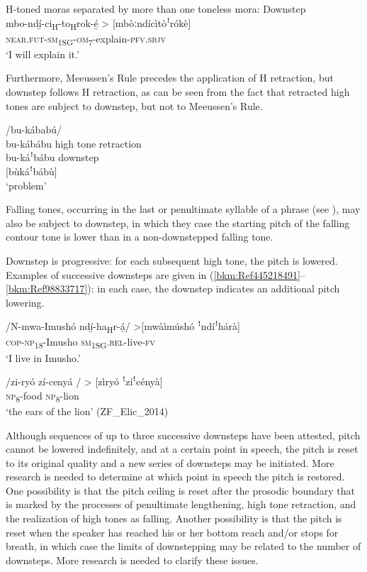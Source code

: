 \ea
\label{bkm:Ref99552164}
  H-toned moras separated by more than one toneless mora: Downstep\\

\gll mbo-ndí̲-ci\textsubscript{H}-to\textsubscript{H}rok-é̲ > [mbòːndícìtòꜝrókè]\\
\textsc{near}.\textsc{fut}-\textsc{sm}\textsubscript{1SG}-\textsc{om}\textsubscript{7}-explain-\textsc{pfv}.\textsc{sbjv}\\
\glt ‘I will explain it.’
\z

Furthermore, Meeussen’s Rule precedes the application of H retraction, but downstep follows H retraction, as can be seen from the fact that retracted high tones are subject to downstep, but not to Meeussen’s Rule.

\ea
 /bu-kábabú/\\
bu-kábábu  high tone retraction\\
bu-káꜝbábu  downstep\\
{}[bùkáꜝbábù]\\
\glt ‘problem’
\z

Falling tones, occurring in the last or penultimate syllable of a phrase (see ), may also be subject to downstep, in which they case the starting pitch of the falling contour tone is lower than in a non-downstepped falling tone.

Downstep is progressive: for each subsequent high tone, the pitch is lowered. Examples of succes\-sive downsteps are given in (\ref{bkm:Ref445218491}--\ref{bkm:Ref98833717}): in each case, the downstep indicates an additional pitch lowering.

\ea
\label{bkm:Ref445218491}
\gll /N-mwa-Imushó  ndí̲-ha\textsubscript{H}r-á̲/ >[mwàìmúshó ꜝndíꜝhárà]\\
\textsc{cop}-\textsc{np}\textsubscript{18}-Imusho  \textsc{sm}\textsubscript{1SG}.\textsc{rel}-live-\textsc{fv}\\
\glt ‘I live in Imusho.’
\z

\ea
\label{bkm:Ref98833717}
\gll /zi-ryó  zí-cenyá / > [zìryó ꜝzíꜝcényà]\\
\textsc{np}\textsubscript{8}-food  \textsc{np}\textsubscript{8}-lion\\
\glt ‘the ears of the lion’ (ZF\_Elic\_2014)
\z

Although sequences of up to three successive downsteps have been attested, pitch cannot be low\-ered indefinitely, and at a certain point in speech, the pitch is reset to its original quality and a new series of downsteps may be initiated. More research is needed to determine at which point in speech the pitch is restored. One possibility is that the pitch ceiling is reset after the prosodic bound\-ary that is marked by the processes of penultimate lengthening, high tone retraction, and the realization of high tones as falling. Another possibility is that the pitch is reset when the speaker has reached his or her bottom reach and/or stops for breath, in which case the limits of downstepping may be related to the number of downsteps. More research is needed to clarify these issues.

